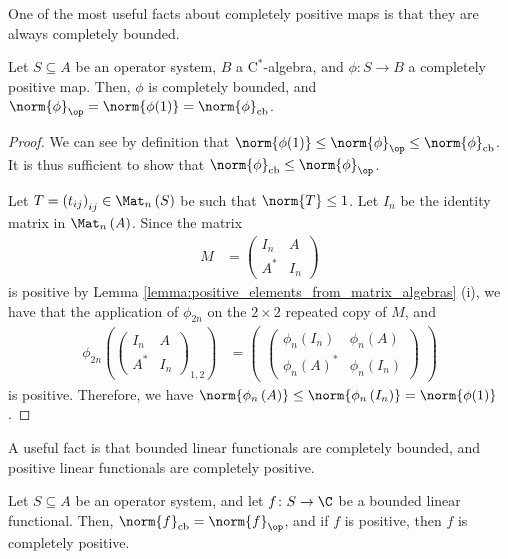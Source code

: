 One of the most useful facts about completely positive maps is that they are always completely bounded.
\begin{proposition}\label{prop:norm_of_completely_positive_map}
  Let $S\subseteq A$ be an operator system, $B$ a $\mathrm{C}^{\ast}$-algebra, and $\phi\colon S\rightarrow B$ a completely positive map. Then, $\phi$ is completely bounded, and $\norm{\phi}_{\op} = \norm{\phi(1)} = \norm{\phi}_{\cb}$.
\end{proposition}
\begin{proof}
  We can see by definition that $\norm{\phi(1)}\leq \norm{\phi}_{\op}\leq \norm{\phi}_{\cb}$. It is thus sufficient to show that $\norm{\phi}_{\cb}\leq \norm{\phi}_{\op}$.\newline

  Let $T = \left( t_{ij} \right)_{ij}\in \Mat_n\left( S \right)$ be such that $\norm{T}\leq 1$. Let $I_n$ be the identity matrix in $\Mat_n\left( A \right)$. Since the matrix
  \begin{align*}
    M &= \begin{pmatrix}I_n & A \\ A^{\ast} & I_n\end{pmatrix}
  \end{align*}
  is positive by Lemma \ref{lemma:positive_elements_from_matrix_algebras} (i), we have that the application of $\phi_{2n}$ on the $2\times 2$ repeated copy of $M$, and 
  \begin{align*}
    \phi_{2n}\left( \begin{pmatrix}I_n & A \\ A^{\ast} & I_n\end{pmatrix}_{1,2} \right) &= \begin{pmatrix} \begin{pmatrix}\phi_n\left( I_n \right) & \phi_n\left( A \right) \\ \phi_n\left( A \right)^{\ast} & \phi_n\left( I_n \right)\end{pmatrix}\end{pmatrix}
  \end{align*}
  is positive. Therefore, we have $\norm{\phi_n\left( A \right)}\leq \norm{\phi_n\left( I_n \right)} = \norm{\phi(1)}$.
\end{proof}
A useful fact is that bounded linear functionals are completely bounded, and positive linear functionals are completely positive.
\begin{proposition}
  Let $S\subseteq A$ be an operator system, and let $f\colon S\rightarrow \C$ be a bounded linear functional. Then, $\norm{f}_{\cb} = \norm{f}_{\op}$, and if $f$ is positive, then $f$ is completely positive.
\end{proposition}
